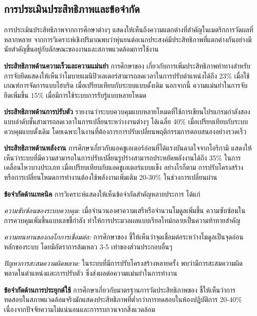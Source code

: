 \documentclass[a4paper]{article}
\begin{document}
\subsection{การประเมินประสิทธิภาพและข้อจำกัด}

การประเมินประสิทธิภาพจากการศึกษาต่างๆ แสดงให้เห็นถึงความแตกต่างที่สำคัญในเมตริกการวัดผลที่หลากหลาย จากการวิเคราะห์เชิงปริมาณพบว่าหุ่นยนต์อเนกประสงค์มีประสิทธิภาพที่แตกต่างกันอย่างมีนัยสำคัญขึ้นอยู่กับลักษณะของงานและสภาพแวดล้อมการใช้งาน

\textbf{ประสิทธิภาพด้านความเร็วและความแม่นยำ} การศึกษาของ \textcite{xie2024pose} เกี่ยวกับการเพิ่มประสิทธิภาพท่าทางสำหรับการจับยึดแสดงให้เห็นว่าโมบายแมนิปิวเลเตอร์สามารถลดเวลาในการปรับตำแหน่งได้ถึง 23\% เมื่อใช้เกณฑ์การจัดการแบบไฮบริด เมื่อเปรียบเทียบกับระบบแบบดั้งเดิม นอกจากนี้ ความแม่นยำในการจับยึดเพิ่มขึ้น 15\% เมื่อมีการใช้ระบบการรับรู้แบบหลายโหมด \parencite{athar2023vistac}

\textbf{ประสิทธิภาพด้านการปรับตัว} \textcite{tassi2024multimodal} รายงานว่าระบบควบคุมแบบหลายโหมดที่ใช้การเขียนโปรแกรมกำลังสองแบบลำดับชั้นสามารถลดเวลาในการเปลี่ยนระหว่างงานต่างๆ ได้เฉลี่ย 40\% เมื่อเปรียบเทียบกับระบบควบคุมแบบดั้งเดิม โดยเฉพาะในงานที่ต้องการการปรับเปลี่ยนพฤติกรรมการตอบสนองอย่างรวดเร็ว

\textbf{ประสิทธิภาพด้านพลังงาน} การศึกษาเกี่ยวกับแอคชูเอเตอร์อ่อนที่ได้แรงบันดาลใจจากโอริกามิ \parencite{jin2021origami} แสดงให้เห็นว่าระบบที่มีความสามารถในการปรับเปลี่ยนรูปร่างสามารถประหยัดพลังงานได้ถึง 35\% ในการเคลื่อนไหวบางประเภท เมื่อเปรียบเทียบกับแอคชูเอเตอร์แบบแข็ง อย่างไรก็ตาม การปรับโครงสร้างหรือการเปลี่ยนโหมดการทำงานต้องใช้พลังงานเพิ่มเติม 20-30\% ในช่วงการเปลี่ยนผ่าน

\textbf{ข้อจำกัดด้านเทคนิค} การวิเคราะห์แสดงให้เห็นข้อจำกัดสำคัญหลายประการ ได้แก่

\textit{ความซับซ้อนของระบบควบคุม:} เมื่อจำนวนองศาความเสรีหรือจำนวนโมดูลเพิ่มขึ้น ความซับซ้อนในการควบคุมเพิ่มขึ้นแบบเลขชี้กำลัง ทำให้การประมวลผลแบบเรียลไทม์กลายเป็นความท้าทายสำคัญ

\textit{ความทนทานของกลไกการเชื่อมต่อ:} การศึกษาของ \textcite{liang2025decoding} ชี้ให้เห็นว่าจุดเชื่อมต่อระหว่างโมดูลเป็นจุดอ่อนหลักของระบบ โดยมีอัตราการล้มเหลว 3-5 เท่าของส่วนประกอบอื่นๆ

\textit{ปัญหาการสะสมความผิดพลาด:} ในระบบที่มีการปรับโครงสร้างหลายครั้ง พบว่ามีการสะสมความผิดพลาดในตำแหน่งและการปรับตัว ซึ่งส่งผลต่อความแม่นยำในการทำงาน

\textbf{ข้อจำกัดด้านการประยุกต์ใช้} การศึกษาเกี่ยวกับมาตรฐานการวัดประสิทธิภาพของ \textcite{bostelman2016mobile} ชี้ให้เห็นว่าการทดสอบในสภาพแวดล้อมจริงมักแสดงประสิทธิภาพที่ต่ำกว่าการทดสอบในห้องปฏิบัติการ 20-40\% เนื่องจากปัจจัยความไม่แน่นอนและการรบกวนจากสิ่งแวดล้อม
\end{document}
